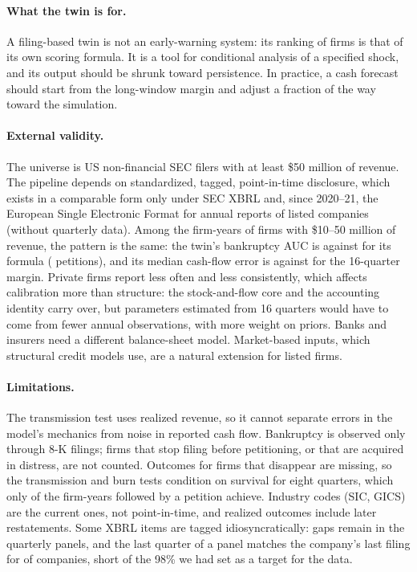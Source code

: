 \documentclass[11pt]{article}
\begin{document}
\paragraph{What the twin is for.} A filing-based twin is not an early-warning system: its ranking of firms is that of its own scoring formula. It is a tool for conditional analysis of a specified shock, and its output should be shrunk toward persistence. In practice, a cash forecast should start from the long-window margin and adjust a fraction of the way toward the simulation.

\paragraph{External validity.} The universe is US non-financial SEC filers with at least \$50 million of revenue. The pipeline depends on standardized, tagged, point-in-time disclosure, which exists in a comparable form only under SEC XBRL and, since 2020--21, the European Single Electronic Format for annual reports of listed companies (without quarterly data). Among the \SmallN{} firm-years of firms with \$10--50 million of revenue, the pattern is the same: the twin's bankruptcy AUC is \SmallAucTwin{} against \SmallAucFormula{} for its formula (\SmallBk{} petitions), and its median cash-flow error is \SmallMaeTwin{} against \SmallMaeSixteen{} for the 16-quarter margin. Private firms report less often and less consistently, which affects calibration more than structure: the stock-and-flow core and the accounting identity carry over, but parameters estimated from 16 quarters would have to come from fewer annual observations, with more weight on priors. Banks and insurers need a different balance-sheet model. Market-based inputs, which structural credit models use, are a natural extension for listed firms.

\paragraph{Limitations.} The transmission test uses realized revenue, so it cannot separate errors in the model's mechanics from noise in reported cash flow. Bankruptcy is observed only through 8-K filings; firms that stop filing before petitioning, or that are acquired in distress, are not counted. Outcomes for firms that disappear are missing, so the transmission and burn tests condition on survival for eight quarters, which only \AttrShareBk{} of the firm-years followed by a petition achieve. Industry codes (SIC, GICS) are the current ones, not point-in-time, and realized outcomes include later restatements. Some XBRL items are tagged idiosyncratically: \AudGapsNew{} gaps remain in the quarterly panels, and the last quarter of a panel matches the company's last filing for \AudLatest{} of companies, short of the 98\% we had set as a target for the data.
\end{document}
